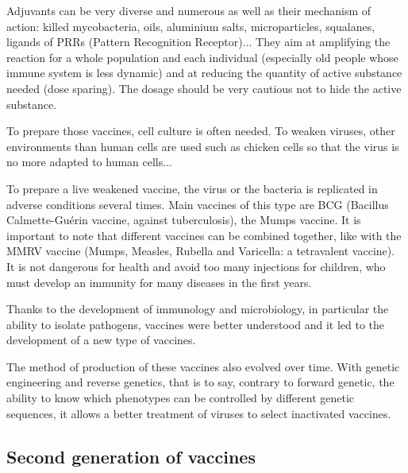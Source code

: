 \documentclass{article}
\begin{document}
            Adjuvants can be very diverse and numerous as well as their mechanism of action: killed mycobacteria, oils, 
                aluminium salts, microparticles, squalanes, ligands of 
                PRRs (Pattern Recognition Receptor)... They aim at amplifying the reaction for a whole population and each individual (especially old people whose immune system is less dynamic) and 
                at reducing the quantity of active substance needed (dose sparing). The dosage should be very cautious not to hide the active substance.
                
            To prepare those vaccines, cell culture is often needed. 
            To weaken viruses, other environments than human cells are used such as chicken cells so that the virus is no more adapted to human cells...

            To prepare a live weakened vaccine, the virus or the bacteria is replicated in adverse conditions several times. Main vaccines of this type are BCG
            (Bacillus Calmette-Guérin vaccine, against tuberculosis), the Mumps vaccine. It is important to note that different vaccines can be combined together,
            like with the MMRV vaccine (Mumps, Measles, Rubella and Varicella: a tetravalent vaccine). It is not dangerous for health and avoid too many injections for children,
            who must develop an immunity for many diseases in the first years.            
                       

            Thanks to the development of immunology and microbiology, in particular the ability to isolate pathogens, vaccines were better understood
                and it led to the development of a new type of vaccines.

            The method of production of these vaccines also evolved over time. With genetic engineering and reverse genetics, that is to say,  
                contrary to forward genetic, the ability to know which phenotypes can be controlled by different genetic sequences,
                it allows a better treatment of viruses to select inactivated vaccines.


        \subsection{Second generation of vaccines}

\end{document}
